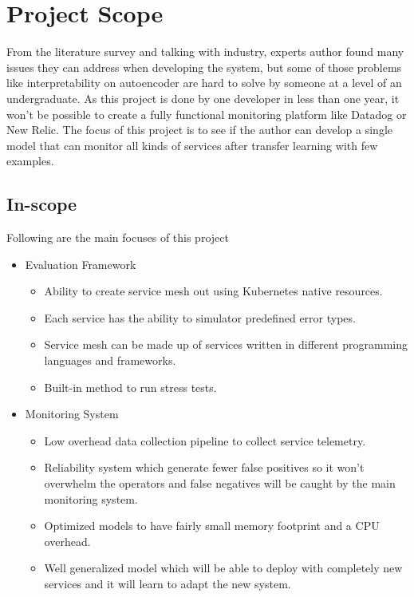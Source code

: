 \section{Project Scope}

From the literature survey and talking with industry, experts author found many issues they can address when developing the system, but some of those problems like interpretability on autoencoder \citep{ribeiro2016should} are hard to solve by someone at a level of an undergraduate. As this project is done by one developer in less than one year, it won't be possible to create a fully functional monitoring platform like Datadog or New Relic. The focus of this project is to see if the author can develop a single model that can monitor all kinds of services after transfer learning with few examples. \\


\subsection{In-scope} \label{sec:in-scope}
Following are the main focuses of this project
\begin{itemize}[noitemsep,nolistsep] 
    \item Evaluation Framework
    \begin{itemize}[noitemsep,nolistsep] 
        \item Ability to create service mesh out using Kubernetes native resources.
        \item Each service has the ability to simulator predefined error types.
        \item Service mesh can be made up of services written in different programming languages and  frameworks.
        \item Built-in method to run stress tests.
    \end{itemize}
    \item Monitoring System
    \begin{itemize}[noitemsep,nolistsep]
        \item Low overhead data collection pipeline to collect service telemetry.
        \item Reliability system which generate fewer false positives so it won't overwhelm the operators and false negatives will be caught by the main monitoring system.
        \item Optimized models to have fairly small memory footprint and a CPU overhead.
        \item Well generalized model which will be able to deploy with completely new services and it will learn to adapt the new system.
    \end{itemize}
\end{itemize}


